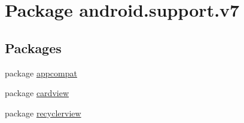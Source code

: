 \hypertarget{namespaceandroid_1_1support_1_1v7}{}\section{Package android.\+support.\+v7}
\label{namespaceandroid_1_1support_1_1v7}
\subsection*{Packages}
\begin{DoxyCompactItemize}
\item 
package \mbox{\hyperlink{namespaceandroid_1_1support_1_1v7_1_1appcompat}{appcompat}}
\item 
package \mbox{\hyperlink{namespaceandroid_1_1support_1_1v7_1_1cardview}{cardview}}
\item 
package \mbox{\hyperlink{namespaceandroid_1_1support_1_1v7_1_1recyclerview}{recyclerview}}
\end{DoxyCompactItemize}
